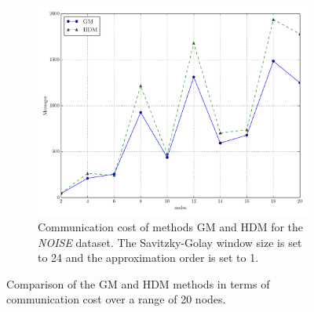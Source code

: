 \begin{figure}[!h]
\begin{subfigure}{0.32\textwidth}
\end{subfigure}\hfill
\begin{subfigure}{0.32\textwidth}%
  \includegraphics[width=\linewidth]{img/main_msg_noisyinterweaving_nodes.pdf}
  \caption{Communication cost of methods GM and HDM for the \emph{NOISE} dataset. The Savitzky-Golay window size is set to 24 and the approximation order is set to 1.}
\end{subfigure}
\vspace{0.5cm}
\caption{Comparison of the GM and HDM methods in terms of communication cost over a range of 20 nodes.} \label{fig:mainComp-msgs}
\end{figure}

